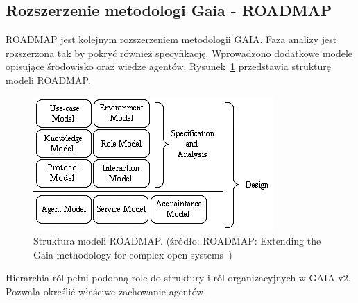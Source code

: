 \documentclass[11pt]{report}
\begin{document}
    \subsection{Rozszerzenie metodologi Gaia - ROADMAP}
    ROADMAP jest kolejnym rozszerzeniem metodologii GAIA\@.
    Faza analizy jest rozszerzona tak by pokryć również specyfikację.
    Wprowadzono dodatkowe modele opisujące środowisko oraz wiedze agentów.
    Rysunek~\ref{fig:roadmap} przedstawia strukturę modeli ROADMAP\@.
    \begin{figure}[!ht]
        \centering
        \includegraphics[width=\linewidth]{fig/roadmap models.png}
        \caption{Struktura modeli ROADMAP. (źródło: ROADMAP: Extending the Gaia methodology for complex open systems~\cite{Juan2002a})}
        \label{fig:roadmap}
    \end{figure}
    Hierarchia ról pełni podobną role do struktury i ról organizacyjnych w GAIA v2.
    Pozwala określić właściwe zachowanie agentów.
\end{document}
